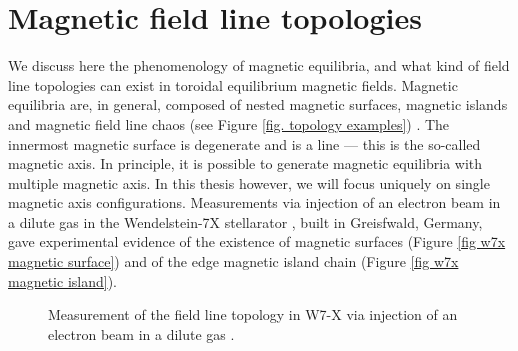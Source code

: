 \documentclass[my_thesis.tex]{subfiles}
\begin{document}
\section{Magnetic field line topologies}
We discuss here the phenomenology of magnetic equilibria, and what kind of field line topologies can exist in toroidal equilibrium magnetic fields. Magnetic equilibria are, in general, composed of nested magnetic surfaces, magnetic islands and magnetic field line chaos (see Figure \ref{fig. topology examples}) \citep{helanderTheoryPlasmaConfinement2014}. The innermost magnetic surface is degenerate and is a line --- this is the so-called magnetic axis. In principle, it is possible to generate magnetic equilibria with multiple magnetic axis. In this thesis however, we will focus uniquely on single magnetic axis configurations. Measurements via injection of an electron beam in a dilute gas in the Wendelstein-7X stellarator \citep{pedersenConfirmationTopologyWendelstein2016}, built in Greisfwald, Germany, gave experimental evidence of the existence of magnetic surfaces (Figure \ref{fig w7x magnetic surface}) and of the edge magnetic island chain (Figure \ref{fig w7x magnetic island}).

\begin{figure}%
	\centering
	\qquad
	\caption{Measurement of the field line topology in W7-X via injection of an electron beam in a dilute gas \citep{pedersenConfirmationTopologyWendelstein2016}.}
	\label{fig. w7x topology measurement}%
\end{figure}
\end{document}
